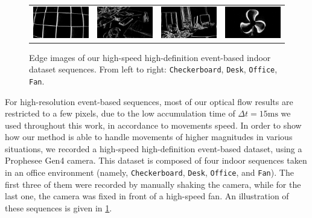 \begin{figure}
  \centering
  \setlength\tabcolsep{1pt}
  \begin{tabular}{@{}cccc@{}}
    \includegraphics[width=0.245\linewidth]{mainmatter/figures/3_optical_flow/high_speed_hd_dataset/checkerboard.png} &
    \includegraphics[width=0.245\linewidth]{mainmatter/figures/3_optical_flow/high_speed_hd_dataset/desk.png} &
    \includegraphics[width=0.245\linewidth]{mainmatter/figures/3_optical_flow/high_speed_hd_dataset/office.png} &
    \includegraphics[width=0.245\linewidth]{mainmatter/figures/3_optical_flow/high_speed_hd_dataset/fan.png} \\
  \end{tabular}
  \cprotect\caption{Edge images of our high-speed high-definition event-based indoor dataset sequences. From left to right: \verb|Checkerboard|, \verb|Desk|, \verb|Office|, \verb|Fan|.}\label{fig:ebof:high_speed_hd_dataset}
\end{figure}

For high-resolution event-based sequences, most of our optical flow results are restricted to a few pixels, due to the low accumulation time of \(\Delta t = 15\text{ms}\) we used throughout this work, in accordance to movements speed. In order to show how our method is able to handle movements of higher magnitudes in various situations, we recorded a high-speed high-definition event-based dataset, using a Prophesee Gen4 camera. This dataset is composed of four indoor sequences taken in an office environment (namely, \verb|Checkerboard|, \verb|Desk|, \verb|Office|, and \verb|Fan|). The first three of them were recorded by manually shaking the camera, while for the last one, the camera was fixed in front of a high-speed fan. An illustration of these sequences is given in \cref{fig:ebof:high_speed_hd_dataset}.


